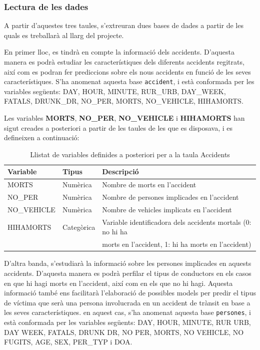 \documentclass[11pt,longbibliography]{article}
\theoremstyle{definition}
\theoremstyle{remark}
\begin{document}
\subsubsection{Lectura de les dades}

A partir d'aquestes tres taules, s'extreuran dues bases de dades a partir de les quals es treballarà al llarg del projecte.


En primer lloc, es tindrà en compte la informació dels accidents. D'aquesta manera es podrà estudiar les característiques dels diferents accidents regitrats, així com es podran fer prediccions sobre els nous accidents en funció de les seves característiques. S'ha anomenat aquesta base \texttt{accident}, i està conformada per les variables següents: DAY, HOUR, MINUTE, RUR\_URB, DAY\_WEEK, FATALS, DRUNK\_DR, NO\_PER, MORTS, NO\_VEHICLE, HIHAMORTS.


Les variables \textbf{MORTS}, \textbf{NO\_PER}, \textbf{NO\_VEHICLE} i \textbf{HIHAMORTS} han sigut creades a posteriori a partir de les taules de les que es disposava, i es defineixen a continuació:


\begin{table}[H]
\centering
\begin{tabular}{|l|l|l|}
\hline
\textbf{Variable} & \textbf{Tipus} & \textbf{Descripció}                         \\ \hline
MORTS             & Numèrica       & Nombre de morts en l'accident               \\
NO\_PER           & Numèrica       & Nombre de persones implicades en l'accident \\
NO\_VEHICLE       & Numèrica       & Nombre de vehicles implicats en l'accident  \\
HIHAMORTS & Categòrica & Variable identificadora dels accidents mortals (0: no hi ha \\
                       &                   &  morts en l'accident, 1: hi ha morts en l'accident) \\ \hline
\end{tabular}
\caption{Llistat de variables definides a posteriori per a la taula Accidents}
\end{table}

D'altra banda, s'estudiarà la informació sobre les persones implicades en aquests accidents. D'aquesta manera es podrà perfilar el tipus de conductors en els casos en que hi hagi morts en l'accident, així com en els que no hi hagi. Aquesta informació també ens facilitarà l'elaboració de possibles models per predir el tipus de víctima que serà una persona involucrada en un accident de trànsit en base a les seves característiques. en aquest cas, s'ha anomenat aquesta base \texttt{persones}, i està conformada per les variables següents: DAY, HOUR, MINUTE, RUR URB, DAY WEEK, FATALS, DRUNK DR, NO PER, MORTS, NO VEHICLE, NO FUGITS, AGE, SEX, PER\_TYP i DOA.
\end{document}
